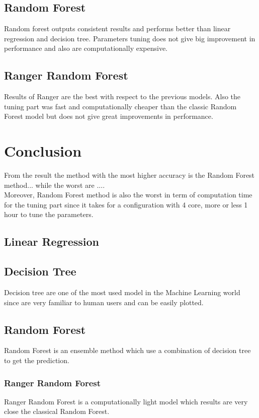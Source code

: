 \documentclass{FR16}
\begin{document}
\subsection{Random Forest}
Random forest outputs consistent results and performs  better than linear regression and decision tree. 
Parameters tuning does not give big improvement in performance and also are computationally expensive.
\\

\subsection{Ranger Random Forest}
Results of Ranger are the best with respect to the previous models. Also the tuning part was fast and computationally cheaper than 
the classic Random Forest model but does not give great improvements in performance.
\\

\section{Conclusion}

From the result the method with the most higher accuracy is the Random Forest method... while the worst are ....
\\Moreover, Random Forest method is also the worst in term of computation time for the tuning part since it takes for a configuration with 4 core, more or less 1 hour to tune the parameters. 

\subsection{Linear Regression}


\subsection{Decision Tree}
Decision  tree are one of the most used model in the Machine Learning world since are very familiar to human users and can be easily plotted. 
\\



\subsection{Random Forest}
Random Forest is an ensemble method which use a combination of decision tree to get the prediction.
\subsubsection{Ranger Random Forest}
Ranger Random Forest is a computationally light model which results are very close the classical Random Forest.
\\
\end{document}
